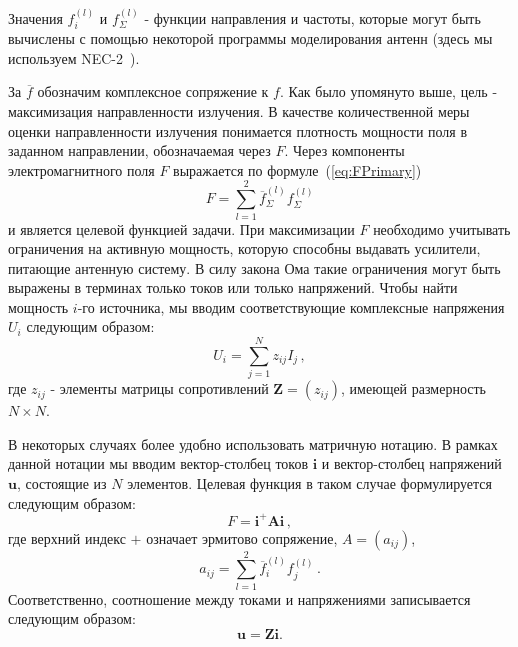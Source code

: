 Значения $f_i^{(l)}$ и $f^{(l)}_{\Sigma}$ - функции направления и частоты, которые могут быть вычислены с помощью некоторой программы моделирования антенн (здесь мы используем NEC-2~\cite{bruke:nec2}).

За $\overline{f}$ обозначим комплексное сопряжение к $f$. Как было упомянуто выше, цель - максимизация направленности излучения. В качестве количественной меры оценки направленности излучения понимается плотность мощности поля в заданном направлении, обозначаемая через $F$. Через компоненты электромагнитного поля $F$ выражается по формуле~(\ref{eq:FPrimary})
%
    \begin{equation}
        F = \sum_{l=1}^{2}\overline{f}_{\Sigma}^{(l)}f_{\Sigma}^{(l)}
        \label{eq:FPrimary}
    \end{equation}
%
и является целевой функцией задачи. При максимизации $F$ необходимо учитывать ограничения на активную мощность, которую способны выдавать усилители, питающие антенную систему. В силу закона Ома такие ограничения могут быть выражены в терминах только токов или только напряжений. Чтобы найти мощность $i$-го источника, мы вводим соответствующие комплексные напряжения~$U_i$ следующим образом:
%
    \begin{equation}
        U_i = \sum_{j=1}^{N}z_{ij}I_j \, ,
        \label{eq:om}
    \end{equation}
%
где $z_{ij}$ - элементы матрицы сопротивлений $\textbf{Z} = (z_{ij})$, имеющей размерность $N \times N$.

В некоторых случаях более удобно использовать матричную нотацию. В рамках данной нотации мы вводим вектор-столбец токов $\textbf{i}$ и вектор-столбец напряжений $\textbf{u}$, состоящие из $N$ элементов. Целевая функция в таком случае формулируется следующим образом:
%
    \begin{equation}
        F = \textbf{i}^{+}\textbf{Ai} \, ,
        \label{eq:F}
    \end{equation}
%
где верхний индекс $+$ означает эрмитово сопряжение, $A = (a_{ij})$,
%
     \begin{equation}
        a_{ij} = \sum_{l=1}^2\overline{f}_{i}^{(l)}f_{j}^{(l)}
        \label{eq:A} \, .
    \end{equation}
%
Соответственно, соотношение между токами и напряжениями записывается следующим образом:
%
    \begin{equation}
    \textbf{u}=\textbf{Z}\textbf{i} .
    \end{equation}
%

